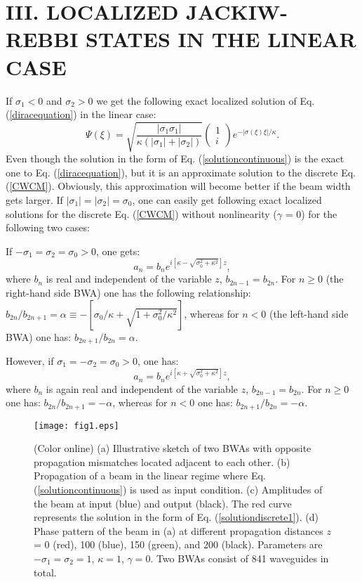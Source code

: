 \documentclass[twocolumn,aps, prl,showpacs]{revtex4}
\newcommand{\eq}[2]{\begin{equation} \label{#1} #2 \end{equation}}
\begin{document}
\section{III. LOCALIZED JACKIW-REBBI STATES IN THE LINEAR CASE}
\label{linearcase}

If $\sigma_{1}<0$ and $\sigma_{2}>0$ we get the following exact localized solution of Eq. (\ref{diracequation}) in the linear case:
\eq{solutioncontinuous}{ \Psi(\xi) = \sqrt{\frac{|\sigma_{1}\sigma_{1}|}{\kappa(|\sigma_{1}|+|\sigma_{2}|)}}\left(\begin{array}{cc} 1 \\ i \end{array}\right)e^{-|\sigma(\xi)\xi|/\kappa}.} Even though the solution in the form of Eq. (\ref{solutioncontinuous}) is the exact one to  Eq. (\ref{diracequation}), but it is an approximate solution to the discrete Eq. (\ref{CWCM}). Obviously, this approximation will become better if the beam width gets larger. If $|\sigma_{1}|=|\sigma_{2}|=\sigma_{0}$, one can easily get following exact localized solutions for the discrete Eq. (\ref{CWCM}) without nonlinearity ($\gamma$ = 0) for the following two cases:

If $-\sigma_{1}=\sigma_{2}=\sigma_{0}>0$, one gets:
\eq{solutiondiscrete1}{a_{n} = b_{n}e^{i[\kappa-\sqrt{\sigma_{0}^{2}+\kappa^{2}}]z},} where $b_{n}$ is real and independent of the variable $z$, $b_{2n-1} = b_{2n}$. For $n\geq0$ (the right-hand side BWA) one has the following relationship: $b_{2n}/b_{2n+1} = \alpha \equiv -[\sigma_{0}/\kappa + \sqrt{1+\sigma_{0}^{2}/\kappa^{2}}]$, whereas for $n<0$ (the left-hand side BWA) one has: $b_{2n+1}/b_{2n} = \alpha$.

However, if $\sigma_{1}=-\sigma_{2}=\sigma_{0}>0$, one has:
\eq{solutiondiscrete2}{a_{n} = b_{n}e^{i[\kappa+\sqrt{\sigma_{0}^{2}+\kappa^{2}}]z},} where $b_{n}$ is again real and independent of the variable $z$, $b_{2n-1} = b_{2n}$. For $n\geq0$ one has: $b_{2n}/b_{2n+1} = -\alpha$, whereas for $n<0$ one has: $b_{2n+1}/b_{2n} = -\alpha$.


\begin{figure}[htb]
  \centering \texttt{[image: fig1.eps]}
\caption{\small{(Color online) (a) Illustrative sketch of two BWAs with opposite propagation mismatches located adjacent to each other. (b) Propagation of a beam in the linear regime where Eq. (\ref{solutioncontinuous}) is used as input condition. (c) Amplitudes of the beam at input (blue) and output (black). The red curve represents the solution in the form of Eq.  (\ref{solutiondiscrete1}). (d) Phase pattern of the beam in (a) at different propagation distances $z$ = 0 (red), 100 (blue), 150 (green), and 200 (black). Parameters are $-\sigma_{1} = \sigma_{2} = 1$, $\kappa = 1$, $\gamma = 0$. Two BWAs consist of 841 waveguides in total.}}
  \label{fig1}
\end{figure}
\end{document}

